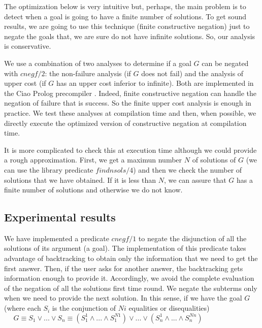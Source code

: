 \documentclass{tlp}
\begin{document}
The optimization below is very intuitive but, perhaps, the main
problem is to detect when a goal is going to have a finite number of
solutions. To get sound results, we are going to use this technique
(finite constructive negation) just to negate the goals that, we are
sure do not have infinite solutions. So, our analysis is conservative.

We use a combination of two analyses to determine if a goal $G$ can be negated with $cnegf/2$: the non-failure analysis
 (if $G$ does not fail) %
and the analysis of upper cost \cite{Lopez2} (if $G$ has an upper cost inferior to infinite). Both are
implemented in the Ciao Prolog precompiler
\cite{ciaopp-iclp99-tut}. Indeed, finite constructive negation can handle the
negation of failure that is success. So the finite upper cost analysis
is enough in practice. We test these analyses at compilation time
and then, when possible, we directly execute the optimized version
of constructive negation at compilation time.


It is more complicated to check this at execution time although we
could provide a rough approximation. First, we get a maximun number
$N$ of solutions of $G$ (we can use the library predicate
$findnsols/4$) and then we check the number of solutions that we have
obtained. If it is less than $N$, we can assure that $G$ has a finite
number of solutions and otherwise we do not know.

\vspace{-0.1in}
\subsection{Experimental results}

We have implemented a predicate $cnegf/1$ to negate the disjunction of
all the solutions of its argument (a goal). The implementation of this
predicate takes advantage of backtracking to obtain only the
information that we need to get the first answer. Then, if the user
asks for another answer, the backtracking gets information enough
to provide it. Accordingly, we avoid the complete evaluation of the
negation of all the solutions first time round. We negate the subterms
only when we need to provide the next solution. In this sense, if we
have the goal $G$ (where each $S_i$ is the conjunction of $Ni$
equalities or disequalities) $~~~~~~G \equiv S_1 \vee ... \vee S_n 
 \equiv (S_1^1 \wedge...\wedge S_1^{N1}) \vee ... \vee (S_n^1
\wedge...\wedge S_n^{Nn}) $
\end{document}
